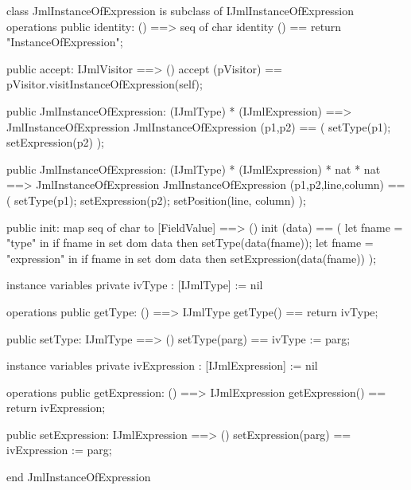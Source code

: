 \begin{vdm_al}
class JmlInstanceOfExpression is subclass of IJmlInstanceOfExpression
operations
  public identity: () ==> seq of char
  identity () == return "InstanceOfExpression";

  public accept: IJmlVisitor ==> ()
  accept (pVisitor) == pVisitor.visitInstanceOfExpression(self);

  public JmlInstanceOfExpression:
    (IJmlType) *
    (IJmlExpression) ==> JmlInstanceOfExpression
  JmlInstanceOfExpression (p1,p2) == 
    ( setType(p1);
      setExpression(p2) );

  public JmlInstanceOfExpression:
    (IJmlType) *
    (IJmlExpression) *
    nat *
    nat ==> JmlInstanceOfExpression
  JmlInstanceOfExpression (p1,p2,line,column) == 
    ( setType(p1);
      setExpression(p2);
      setPosition(line, column) );

  public init: map seq of char to [FieldValue] ==> ()
  init (data) ==
    ( let fname = "type" in
        if fname in set dom data
        then setType(data(fname));
      let fname = "expression" in
        if fname in set dom data
        then setExpression(data(fname)) );

instance variables
  private ivType : [IJmlType] := nil

operations
  public getType: () ==> IJmlType
  getType() == return ivType;

  public setType: IJmlType ==> ()
  setType(parg) == ivType := parg;

instance variables
  private ivExpression : [IJmlExpression] := nil

operations
  public getExpression: () ==> IJmlExpression
  getExpression() == return ivExpression;

  public setExpression: IJmlExpression ==> ()
  setExpression(parg) == ivExpression := parg;

end JmlInstanceOfExpression
\end{vdm_al}

